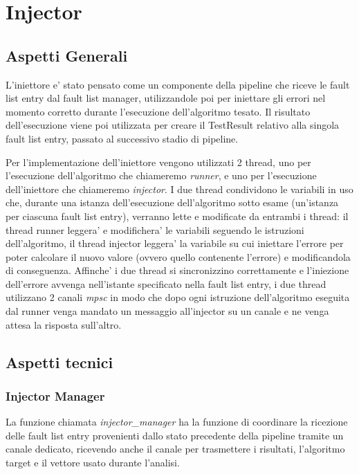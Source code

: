 \section{Injector}\label{sec: Injector}
\subsection{Aspetti Generali}
L'iniettore e' stato pensato come un componente della pipeline che riceve le fault list entry dal fault list manager, utilizzandole poi per iniettare gli errori nel momento corretto durante l'esecuzione dell'algoritmo tesato. Il risultato dell'esecuzione viene poi utilizzata per creare il TestResult relativo alla singola fault list entry, passato al successivo stadio di pipeline. 

Per l'implementazione dell'iniettore vengono utilizzati 2 thread, uno per l'esecuzione dell'algoritmo che chiameremo \textit{runner}, e uno per l'esecuzione dell'i\-niettore che chiameremo \textit{injector}. I due thread condividono le variabili in uso che, durante una istanza dell'esecuzione dell'algoritmo sotto esame (un'istanza per ciascuna fault list entry), verranno lette e modificate da entrambi i thread: il thread runner leggera' e modifichera' le variabili seguendo le istruzioni dell'algo\-ritmo, il thread injector leggera' la variabile su cui iniettare l'errore per poter calcolare il nuovo valore (ovvero quello contenente l'errore) e modificandola di conseguenza. Affinche' i due thread si sincronizzino correttamente e l'iniezione dell'errore avvenga nell'istante specificato nella fault list entry, i due thread utilizzano 2 canali \textit{mpsc} in modo che dopo ogni istruzione dell'algoritmo eseguita dal runner venga mandato un messaggio all'injector su un canale e ne venga attesa la risposta sull'altro.

\subsection{Aspetti tecnici}
\subsubsection{Injector Manager}
La funzione chiamata \textit{injector\_manager} ha la funzione di coordinare la ricezione delle fault list entry provenienti dallo stato precedente della pipeline tramite un canale dedicato, ricevendo anche il canale per trasmettere i risultati, l'algoritmo target e il vettore usato durante l'analisi.

